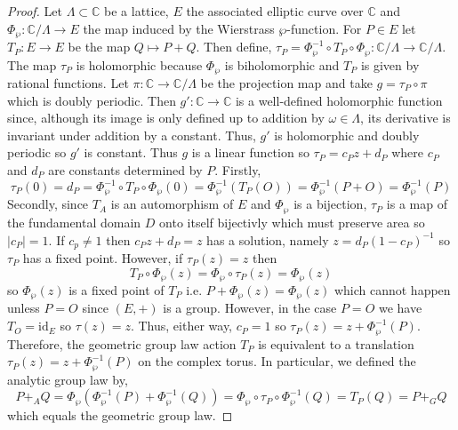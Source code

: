 \documentclass[12pt]{extarticle}
\newcommand{\id}{\mathrm{id}}
\theoremstyle{definition}
\newcommand{\C}{\mathbb{C}}
\begin{document}
\begin{proof}
Let $\Lambda \subset \C$ be a lattice, $E$ the associated elliptic curve over $\C$ and $\Phi_{\wp} : \C / \Lambda \to E$ the map induced by the Wierstrass $\wp$-function. For $P \in E$ let $T_P : E \to E$ be the map $Q \mapsto P + Q$. Then define, $\tau_P = \Phi_{\wp}^{-1} \circ T_P \circ \Phi_{\wp} : \C / \Lambda \to \C / \Lambda$. The map $\tau_P$ is holomorphic because $\Phi_{\wp}$ is biholomorphic and $T_P$ is given by rational functions. Let $\pi : \C \to \C / \Lambda$ be the projection map and take $g = \tau_P \circ \pi$ which is doubly periodic. Then $g' : \C \to \C$ is a well-defined holomorphic function since, although its image is only defined up to addition by $\omega \in \Lambda$, its derivative is invariant under addition by a constant. Thus, $g'$ is holomorphic and doubly periodic so $g'$ is constant. Thus $g$ is a linear function so $\tau_P = c_P z + d_P$ where $c_P$ and $d_P$ are constants determined by $P$. Firstly, 
\[ \tau_P(0) = d_P =  \Phi_{\wp}^{-1} \circ T_P \circ \Phi_{\wp}(0) = \Phi_{\wp}^{-1}(T_P(O)) = \Phi_{\wp}^{-1}(P + O) = \Phi_{\wp}^{-1}(P) \]
Secondly, since $T_A$ is an automorphism of $E$ and $\Phi_{\wp}$ is a bijection, $\tau_P$ is a map of the fundamental domain $D$ onto itself bijectivly which must preserve area so $|c_P| = 1$. If $c_p \neq 1$ then $c_P z + d_P = z$ has a solution, namely $z = d_P (1 - c_P)^{-1}$ so $\tau_P$ has a fixed point. However, if $\tau_P(z) = z$ then 
\[ T_P \circ \Phi_{\wp}(z) = \Phi_{\wp} \circ \tau_P(z) = \Phi_{\wp}(z) \]
so $\Phi_{\wp}(z)$ is a fixed point of $T_P$ i.e. $P + \Phi_{\wp}(z) = \Phi_{\wp}(z)$ which cannot happen unless $P = O$ since $(E, +)$ is a group. However, in the case $P = O$ we have $T_O = \id_E$ so $\tau(z) = z$. Thus, either way, $c_P = 1$ so $\tau_P(z) = z + \Phi_{\wp}^{-1}(P)$. Therefore, the geometric group law action $T_P$ is equivalent to a translation $\tau_P(z) = z + \Phi_{\wp}^{-1}(P)$ on the complex torus. In particular, we defined the analytic group law by,
\[ P +_A Q = \Phi_{\wp}(\Phi_{\wp}^{-1}(P) + \Phi_{\wp}^{-1}(Q)) = \Phi_{\wp} \circ \tau_P \circ \Phi_{\wp}^{-1}(Q) = T_P(Q) = P +_G Q \]
which equals the geometric group law.
\end{proof}
\end{document}
